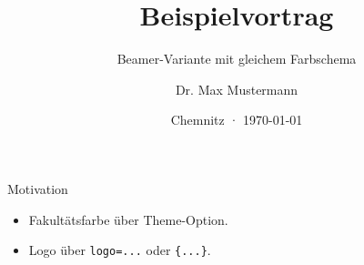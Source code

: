 \documentclass{beamer}
\title[Beispiel]{Beispielvortrag}
\subtitle{Beamer-Variante mit gleichem Farbschema}
\author[Max Mustermann]{Dr. Max Mustermann}
\institute{Technische Universität Chemnitz}
\date{Chemnitz · \today}
\begin{document}
\begin{frame}\titlepage\end{frame}
\begin{frame}{Motivation}
\begin{itemize}
\item Fakultätsfarbe über Theme-Option.
\item Logo über \texttt{logo=...} oder \texttt{\string\tucsetlogo\{...\}}.
\end{itemize}
\end{frame}
\end{document}
